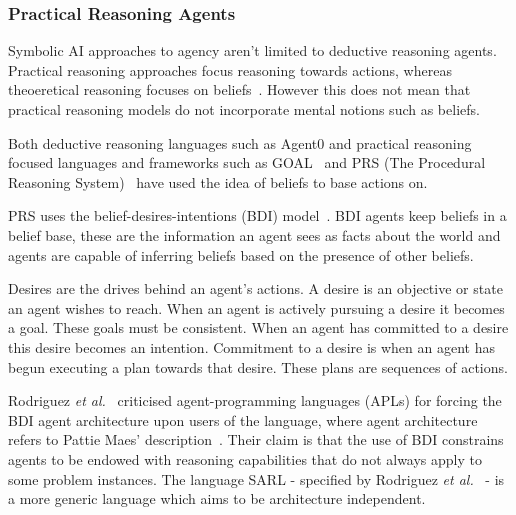 \documentclass[]{final_report}
\begin{document}
\subsubsection{Practical Reasoning Agents}
Symbolic AI approaches to agency aren't limited to deductive reasoning agents. Practical reasoning approaches focus reasoning towards actions, whereas theoeretical reasoning focuses on beliefs~\cite{wooldridge2009introduction}. However this does not mean that practical reasoning models do not incorporate mental notions such as beliefs.\par  
Both deductive reasoning languages such as Agent0 and practical reasoning focused languages and frameworks such as GOAL~\cite{hindriks2000agent} and PRS (The Procedural Reasoning System)~\cite{georgeff1987reactive} have used the idea of beliefs to base actions on.\par 
PRS uses the belief-desires-intentions (BDI) model~\cite{bratman1987intention}. BDI agents keep beliefs in a belief base, these are the information an agent sees as facts about the world and agents are capable of inferring beliefs based on the presence of other beliefs.\par 
Desires are the drives behind an agent's actions. A desire is an objective or state an agent wishes to reach. When an agent is actively pursuing a desire it becomes a goal. These goals must be consistent. When an agent has committed to a desire this desire becomes an intention. Commitment to a desire is when an agent has begun executing a plan towards that desire. These plans are sequences of actions.\par 
Rodriguez \textit{et al.}~\cite{rodriguez2014sarl} criticised agent-programming languages (APLs) for forcing the BDI agent architecture upon users of the language, where agent architecture refers to Pattie Maes' description~\cite{Maes:1991:ANA:122344.122367}. Their claim is that the use of BDI constrains agents to be endowed with reasoning capabilities that do not always apply to some problem instances. The language SARL - specified by Rodriguez \textit{et al.}~\cite{rodriguez2014sarl} - is a more generic language which aims to be architecture independent. 
\end{document}
